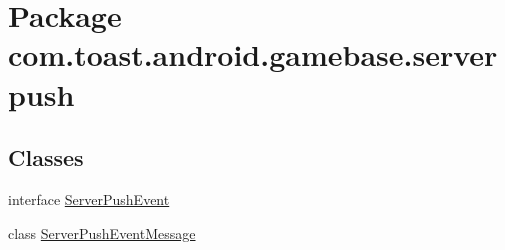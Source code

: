 \hypertarget{namespacecom_1_1toast_1_1android_1_1gamebase_1_1serverpush}{}\section{Package com.\+toast.\+android.\+gamebase.\+serverpush}
\label{namespacecom_1_1toast_1_1android_1_1gamebase_1_1serverpush}
\subsection*{Classes}
\begin{DoxyCompactItemize}
\item 
interface \hyperlink{interfacecom_1_1toast_1_1android_1_1gamebase_1_1serverpush_1_1_server_push_event}{Server\+Push\+Event}
\item 
class \hyperlink{classcom_1_1toast_1_1android_1_1gamebase_1_1serverpush_1_1_server_push_event_message}{Server\+Push\+Event\+Message}
\end{DoxyCompactItemize}
